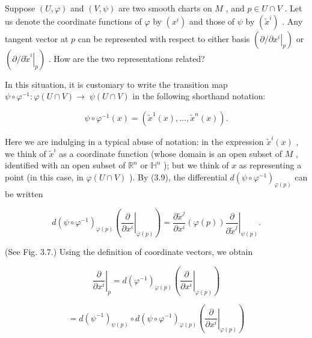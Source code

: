 \begin{remark}
\label{rem:3-15-extra-4}
\mathlibok
Suppose $\left( {U,\varphi }\right)$ and $\left( {V,\psi }\right)$ are two smooth charts on $M$ , and $p \in  U \cap  V$ . Let us denote the coordinate functions of $\varphi$ by $\left( {x}^{i}\right)$ and those of $\psi$ by $\left( {\widetilde{x}}^{i}\right)$ . Any tangent vector at $p$ can be represented with respect to either basis $\left( {\partial /{\left. \partial {x}^{i}\right| }_{p}}\right)$ or $\left( {\partial /{\left. \partial {\widetilde{x}}^{i}\right| }_{p}}\right)$ . How are the two representations related?

In this situation, it is customary to write the transition map $\psi  \circ  {\varphi }^{-1} : \varphi \left( {U \cap  V}\right)  \rightarrow \; \psi \left( {U \cap  V}\right)$ in the following shorthand notation:

\[
\psi  \circ  {\varphi }^{-1}\left( x\right)  = \left( {{\widetilde{x}}^{1}\left( x\right) ,\ldots ,{\widetilde{x}}^{n}\left( x\right) }\right) .
\]

Here we are indulging in a typical abuse of notation: in the expression ${\widetilde{x}}^{i}\left( x\right)$ , we think of ${\widetilde{x}}^{i}$ as a coordinate function (whose domain is an open subset of $M$ , identified with an open subset of ${\mathbb{R}}^{n}$ or ${\mathbb{H}}^{n}$ ); but we think of $x$ as representing a point (in this case, in $\varphi \left( {U \cap  V}\right)$ ). By (3.9), the differential $d{\left( \psi  \circ  {\varphi }^{-1}\right) }_{\varphi \left( p\right) }$ can be written

\[
d{\left( \psi  \circ  {\varphi }^{-1}\right) }_{\varphi \left( p\right) }\left( {\left. \frac{\partial }{\partial {x}^{i}}\right| }_{\varphi \left( p\right) }\right)  = \frac{\partial {\widetilde{x}}^{j}}{\partial {x}^{i}}\left( {\varphi \left( p\right) }\right) {\left. \frac{\partial }{\partial {\widetilde{x}}^{j}}\right| }_{\psi \left( p\right) }.
\]

(See Fig. 3.7.) Using the definition of coordinate vectors, we obtain

\[
{\left. \frac{\partial }{\partial {x}^{i}}\right| }_{p} = d{\left( {\varphi }^{-1}\right) }_{\varphi \left( p\right) }\left( {\left. \frac{\partial }{\partial {x}^{i}}\right| }_{\varphi \left( p\right) }\right)
\]

\[
= d{\left( {\psi }^{-1}\right) }_{\psi \left( p\right) } \circ  d{\left( \psi  \circ  {\varphi }^{-1}\right) }_{\varphi \left( p\right) }\left( {\left. \frac{\partial }{\partial {x}^{i}}\right| }_{\varphi \left( p\right) }\right)
\]


\end{remark}
